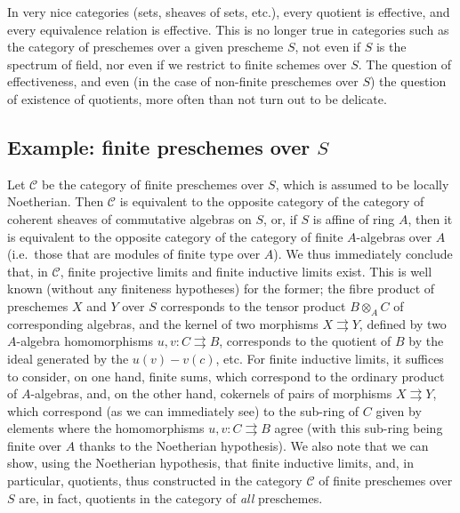 \documentclass{article}
\theoremstyle{definition}
\theoremstyle{definition}
\theoremstyle{definition}
\theoremstyle{definition}
\theoremstyle{remark}
\begin{document}
In very nice categories (sets, sheaves of sets, etc.), every quotient is effective, and every equivalence relation is effective.
This is no longer true in categories such as the category of preschemes over a given prescheme \(S\), not even if \(S\) is the spectrum of field, nor even if we restrict to finite schemes over \(S\).
The question of effectiveness, and even (in the case of non-finite preschemes over \(S\)) the question of existence of quotients, more often than not turn out to be delicate.

\hypertarget{fga-3-iii-section-2}{%
\subsection{\texorpdfstring{Example: finite preschemes over \(S\)}{Example: finite preschemes over S}}\label{fga-3-iii-section-2}}

Let \({\mathcal{C}}\) be the category of finite preschemes over \(S\), which is assumed to be locally Noetherian.
Then \({\mathcal{C}}\) is equivalent to the opposite category of the category of coherent sheaves of commutative algebras on \(S\), or, if \(S\) is affine of ring \(A\), then it is equivalent to the opposite category of the category of finite \(A\)-algebras over \(A\) (i.e.~those that are modules of finite type over \(A\)).
We thus immediately conclude that, in \({\mathcal{C}}\), finite projective limits and finite inductive limits exist.
This is well known (without any finiteness hypotheses) for the former;
the fibre product of preschemes \(X\) and \(Y\) over \(S\) corresponds to the tensor product \(B\otimes_A C\) of corresponding algebras, and the kernel of two morphisms \(X\rightrightarrows Y\), defined by two \(A\)-algebra homomorphisms \(u,v\colon C\rightrightarrows B\), corresponds to the quotient of \(B\) by the ideal generated by the \(u(v)-v(c)\), etc.
For finite inductive limits, it suffices to consider, on one hand, finite sums, which correspond to the ordinary product of \(A\)-algebras, and, on the other hand, cokernels of pairs of morphisms \(X\rightrightarrows Y\), which correspond (as we can immediately see) to the sub-ring of \(C\) given by elements where the homomorphisms \(u,v\colon C\rightrightarrows B\) agree (with this sub-ring being finite over \(A\) thanks to the Noetherian hypothesis).
We also note that we can show, using the Noetherian hypothesis, that finite inductive limits, and, in particular, quotients, thus constructed in the category \({\mathcal{C}}\) of finite preschemes over \(S\) are, in fact, quotients in the category of \emph{all} preschemes.
\end{document}
